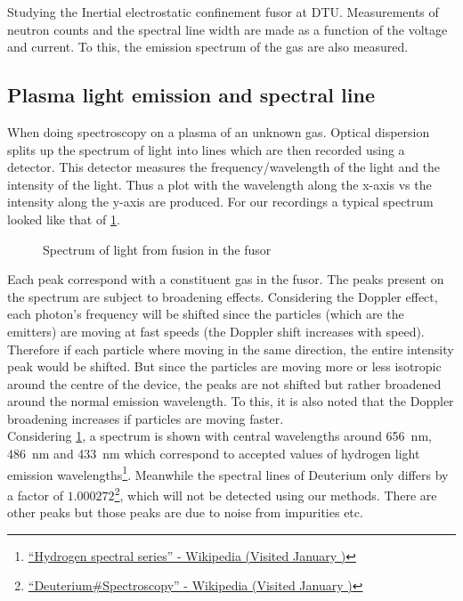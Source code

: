 Studying the Inertial electrostatic confinement fusor at DTU. Measurements of neutron counts and the spectral line width are made as a function of the voltage and current. To this, the emission spectrum of the gas are also measured.
\subsection{Plasma light emission and spectral line}
When doing spectroscopy on a plasma of an unknown gas. Optical dispersion splits up the spectrum of light into lines which are then recorded using a detector. This detector measures the frequency/wavelength of the light and the intensity of the light. Thus a plot with the wavelength along the x-axis vs the intensity along the y-axis are produced. For our recordings a typical spectrum looked like that of \cref{SPEC}.
\begin{figure}[H]
	\centering
	\caption{Spectrum of light from fusion in the fusor}
	\label{SPEC}
\end{figure}
Each peak correspond with a constituent gas in the fusor.
The peaks present on the spectrum are subject to broadening effects. Considering the Doppler effect, each photon's frequency will be shifted since the particles (which are the emitters) are moving at fast speeds (the Doppler shift increases with speed). Therefore if each particle where moving in the same direction, the entire intensity peak would be shifted. But since the particles are moving more or less isotropic around the centre of the device, the peaks are not shifted but rather broadened around the normal emission wavelength. To this, it is also noted that the Doppler broadening increases if particles are moving faster.\\
Considering \cref{SPEC}, a spectrum is shown with central wavelengths around \SI{656}{\nano\meter}, \SI{486}{\nano\meter} and \SI{433}{\nano\meter} which correspond to accepted values of hydrogen light emission wavelengths\footnote{\href{https://en.wikipedia.org/wiki/Hydrogen_spectral_series}{``Hydrogen spectral series'' - Wikipedia (Visited January )}}. Meanwhile the spectral lines of Deuterium only differs by a factor of $1.000272$\footnote{\href{https://en.wikipedia.org/wiki/Deuterium#Spectroscopy}{``Deuterium\#Spectroscopy'' - Wikipedia (Visited January )}}, which will not be detected using our methods. There are other peaks but those peaks are due to noise from impurities etc.\\
